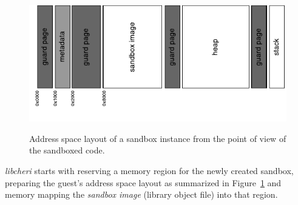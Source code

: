 \documentclass[a4paper,12pt,twoside,openright]{report}
\newcommand{\tool}[1]{\emph{#1}}
\newcommand{\lib}[1]{\tool{lib#1}}
\begin{document}

\begin{figure}
	\centering
	\includegraphics[width=1.0\textwidth]{dia_address_layout.pdf}
	\label{fig:addressSpaceLayout}
	\caption{Address space layout of a sandbox instance from the point of view of the sandboxed code.}
\end{figure}

\lib{cheri} starts with reserving a memory region for the newly created sandbox, preparing the guest's address space layout as summarized in Figure~\ref{fig:addressSpaceLayout} and memory mapping the \emph{sandbox image} (library object file) into that region. 
\end{document}
